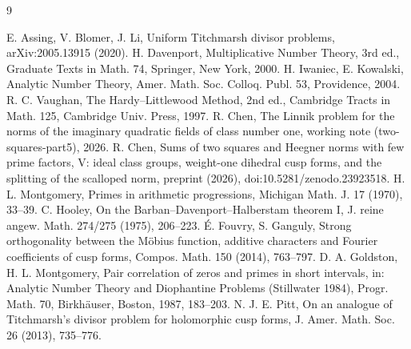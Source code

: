 ﻿\documentclass[11pt]{amsart}
\theoremstyle{remark}
\begin{document}
\begin{thebibliography}{9}\raggedright
{} E. Assing, V. Blomer, J. Li, Uniform Titchmarsh divisor problems, arXiv:2005.13915 (2020).
 H. Davenport, Multiplicative Number Theory, 3rd ed., Graduate Texts in Math. 74, Springer, New York, 2000.
 H. Iwaniec, E. Kowalski, Analytic Number Theory, Amer. Math. Soc. Colloq. Publ. 53, Providence, 2004.
 R. C. Vaughan, The Hardy--Littlewood Method, 2nd ed., Cambridge Tracts in Math. 125, Cambridge Univ. Press, 1997.
 R. Chen, The Linnik problem for the norms of the imaginary quadratic fields of class number one, working note (two-squares-part5), 2026.
 R. Chen, Sums of two squares and Heegner norms with few prime factors, V: ideal class groups, weight-one dihedral cusp forms, and the splitting of the scalloped norm, preprint (2026), doi:10.5281/zenodo.23923518.
 H. L. Montgomery, Primes in arithmetic progressions, Michigan Math. J. 17 (1970), 33--39.
 C. Hooley, On the Barban--Davenport--Halberstam theorem I, J. reine angew. Math. 274/275 (1975), 206--223.
 \'E. Fouvry, S. Ganguly, Strong orthogonality between the M\"obius function, additive characters and Fourier coefficients of cusp forms, Compos. Math. 150 (2014), 763--797.
 D. A. Goldston, H. L. Montgomery, Pair correlation of zeros and primes in short intervals, in: Analytic Number Theory and Diophantine Problems (Stillwater 1984), Progr. Math. 70, Birkh\"auser, Boston, 1987, 183--203.
 N. J. E. Pitt, On an analogue of Titchmarsh's divisor problem for holomorphic cusp forms, J. Amer. Math. Soc. 26 (2013), 735--776.
\end{thebibliography}
\end{document}
